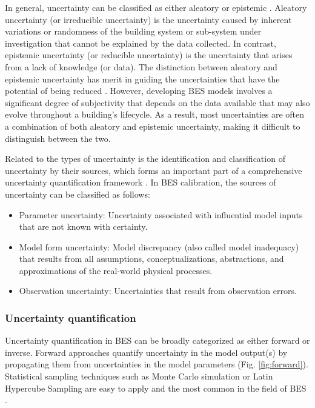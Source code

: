 \documentclass[review]{elsarticle}
\begin{document}
In general, uncertainty can be classified as either aleatory or epistemic \cite{tian2018review, roy2011comprehensive}. Aleatory uncertainty (or irreducible uncertainty) is the uncertainty caused by inherent variations or randomness of the building system or sub-system under investigation that cannot be explained by the data collected. In contrast, epistemic uncertainty (or reducible uncertainty) is the uncertainty that arises from a lack of knowledge (or data). The distinction between aleatory and epistemic uncertainty has merit in guiding the uncertainties that have the potential of being reduced \cite{der2009aleatory}. However, developing BES models involves a significant degree of subjectivity that depends on the data available that may also evolve throughout a building's lifecycle. As a result, most uncertainties are often a combination of both aleatory and epistemic uncertainty, making it difficult to distinguish between the two. 

Related to the types of uncertainty is the identification and classification of uncertainty by their sources, which forms an important part of a comprehensive uncertainty quantification framework \cite{roy2011comprehensive, sun2014closing}. In BES calibration, the sources of uncertainty can be classified as follows:
\begin{itemize}
    \item Parameter uncertainty: Uncertainty associated with influential model inputs that are not known with certainty. 
    \item Model form uncertainty: Model discrepancy (also called model inadequacy) that results from all assumptions, conceptualizations, abstractions, and approximations of the real-world physical processes. 
    \item Observation uncertainty: Uncertainties that result from observation errors. 
\end{itemize}

\subsubsection{Uncertainty quantification}

Uncertainty quantification in BES can be broadly categorized as either forward or inverse. Forward approaches quantify uncertainty in the model output(s) by propagating them from uncertainties in the model parameters (Fig. \ref{fig:forward}). Statistical sampling techniques such as Monte Carlo simulation or Latin Hypercube Sampling are easy to apply and the most common in the field of BES \cite{yun2017development, harmer2015using, cipriano2015evaluation, sakiyama2020natural, giuliani2016modeling}.
\end{document}
